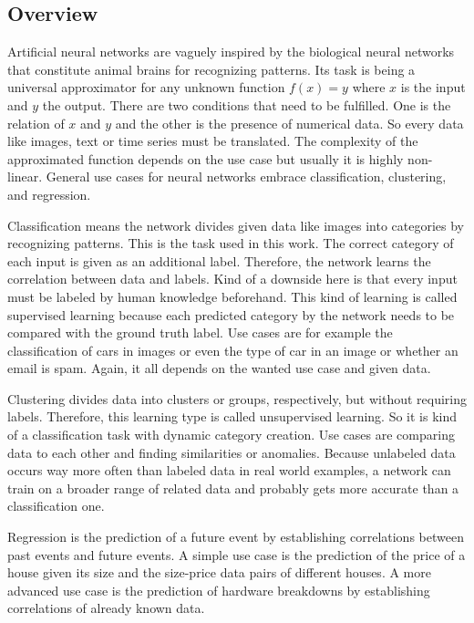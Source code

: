 \subsection{Overview}
\label{sec:neural-networks-overview}
Artificial neural networks are vaguely inspired by the biological neural networks that constitute animal brains for recognizing patterns.
Its task is being a universal approximator for any unknown function $f(x) = y$ where $x$ is the input and $y$ the output.
There are two conditions that need to be fulfilled.
One is the relation of $x$ and $y$ and the other is the presence of numerical data.
So every data like images, text or time series must be translated.
The complexity of the approximated function depends on the use case but usually it is highly non-linear.
General use cases for neural networks embrace classification, clustering, and regression.

Classification means the network divides given data like images into categories by recognizing patterns.
This is the task used in this work.
The correct category of each input is given as an additional label.
Therefore, the network learns the correlation between data and labels.
Kind of a downside here is that every input must be labeled by human knowledge beforehand.
This kind of learning is called supervised learning because each predicted category by the network needs to be compared with the ground truth label.
Use cases are for example the classification of cars in images or even the type of car in an image or whether an email is spam.
Again, it all depends on the wanted use case and given data.

Clustering divides data into clusters or groups, respectively, but without requiring labels.
Therefore, this learning type is called unsupervised learning.
So it is kind of a classification task with dynamic category creation.
Use cases are comparing data to each other and finding similarities or anomalies.
Because unlabeled data occurs way more often than labeled data in real world examples, a network can train on a broader range of related data and probably gets more accurate than a classification one.

Regression is the prediction of a future event by establishing correlations between past events and future events.
A simple use case is the prediction of the price of a house given its size and the size-price data pairs of different houses.
A more advanced use case is the prediction of hardware breakdowns by establishing correlations of already known data.